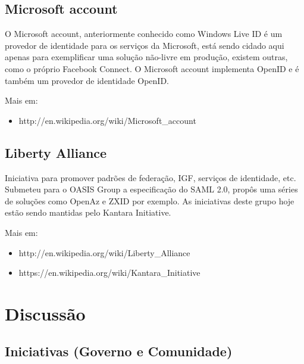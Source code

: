 \documentclass[11pt]{article}
\begin{document}
\subsection{Microsoft account}

O Microsoft account, anteriormente conhecido como Windows Live ID é um
provedor de identidade para os serviços da Microsoft, está sendo cidado aqui
apenas para exemplificar uma solução não-livre em produção, existem outras,
como o próprio Facebook Connect. O Microsoft account implementa OpenID e é
também um provedor de identidade OpenID.

Mais em:
\begin{itemize}
  \item{http://en.wikipedia.org/wiki/Microsoft\_account}
\end{itemize}

\subsection{Liberty Alliance}

Iniciativa para promover padrões de federação, IGF, serviços de identidade,
etc. Submeteu para o OASIS Group a especificação do SAML 2.0, propôs uma
séries de soluções como OpenAz e ZXID por exemplo. As iniciativas deste grupo
hoje estão sendo mantidas pelo Kantara Initiative.

Mais em:
\begin{itemize}
  \item{http://en.wikipedia.org/wiki/Liberty\_Alliance}
  \item{https://en.wikipedia.org/wiki/Kantara\_Initiative}
\end{itemize}

\section{Discussão}

%
%
%

\subsection{Iniciativas (Governo e Comunidade)}
\end{document}
